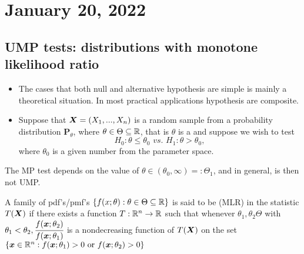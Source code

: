 \section{January 20, 2022}
\subsection{UMP tests: distributions with monotone likelihood ratio}
\begin{itemize}
    \item The cases that both null and alternative hypothesis are simple is mainly a theoretical situation. In most practical applications hypothesis are composite.
    \item Suppose that $\boldsymbol{X} = (X_1,...,X_n)$ is a random sample from a probability distribution $\boldsymbol{P}_{\theta}$, where $\theta \in \Theta \subseteq \mathbb R$, that is  $\theta$ is a  and suppose we wish to test
    $$
    H_0: \theta \leq \theta_0 \textit{ vs. } H_1:\theta > \theta_0,
    $$
    where $\theta_0$ is a given number from the parameter space. 
    
\end{itemize}
The MP test depends on the value of $\theta \in (\theta_0,\infty) =: \Theta_1$, and in general, is then not UMP.

\begin{definition}
    A family of pdf's/pmf's 
    $\{ f(x;\theta): \theta \in \Theta \subseteq \mathbb R \}$
    is said to be  (MLR) in the statistic $T(\boldsymbol{X})$ if there exists a function $T:\mathbb R^n \to \mathbb R$ such that whenever $\theta_1, \theta_2 \Theta$ with $\theta_1 < \theta_2, \cfrac{f(\boldsymbol{x};\theta_2)}{f(\boldsymbol{x};\theta_1)}$ is a nondecreasing function of $T(\boldsymbol{X})$ on the set 
    $\{
    \boldsymbol{x} \in \mathbb R^n: f(\boldsymbol{x};\theta_1)>0 \text{ or } f(\boldsymbol{x};\theta_2)>0
    \}$
    
\end{definition}

